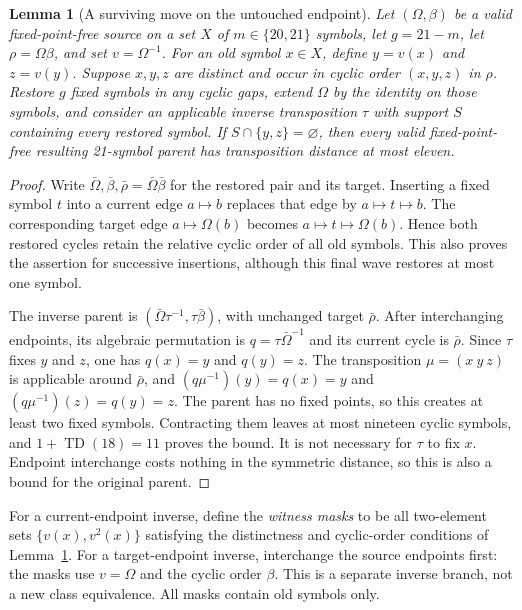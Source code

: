\documentclass[11pt,a4paper]{article}
\newcommand{\TD}{\operatorname{TD}}
\newtheorem{lemma}{Lemma}
\begin{document}
\begin{lemma}[A surviving move on the untouched endpoint]
\label{lem:inverse-family}
Let $(\Omega,\beta)$ be a valid fixed-point-free source on a set $X$ of
$m\in\{20,21\}$ symbols, let $g=21-m$, let $\rho=\Omega\beta$, and set
$v=\Omega^{-1}$. For an old symbol $x\in X$, define $y=v(x)$ and $z=v(y)$.
Suppose $x,y,z$ are distinct and occur in cyclic order $(x,y,z)$ in $\rho$.
Restore $g$ fixed symbols in any cyclic gaps, extend $\Omega$ by the identity
on those symbols, and consider an applicable inverse transposition $\tau$
with support $S$ containing every restored symbol. If
$S\cap\{y,z\}=\varnothing$, then every valid fixed-point-free resulting
21-symbol parent has transposition distance at most eleven.
\end{lemma}
\begin{proof}
Write $\bar\Omega,\bar\beta,\bar\rho=\bar\Omega\bar\beta$ for the restored
pair and its target. Inserting a fixed symbol $t$ into a current edge
$a\mapsto b$ replaces that edge by $a\mapsto t\mapsto b$. The corresponding
target edge $a\mapsto\Omega(b)$ becomes
$a\mapsto t\mapsto\Omega(b)$. Hence both restored cycles retain the
relative cyclic order of all old symbols. This also proves the assertion for
successive insertions, although this final wave restores at most one symbol.

The inverse parent is
$(\bar\Omega\tau^{-1},\tau\bar\beta)$, with unchanged target $\bar\rho$.
After interchanging endpoints, its algebraic permutation is
$q=\tau\bar\Omega^{-1}$ and its current cycle is $\bar\rho$. Since $\tau$
fixes $y$ and $z$, one has $q(x)=y$ and $q(y)=z$. The transposition
$\mu=(x\ y\ z)$ is applicable around $\bar\rho$, and
$(q\mu^{-1})(y)=q(x)=y$ and $(q\mu^{-1})(z)=q(y)=z$. The parent has no
fixed points, so this creates at least two fixed symbols. Contracting them
leaves at most nineteen cyclic symbols, and
$1+\TD(18)=11$ proves the bound. It is not necessary for $\tau$ to fix $x$.
Endpoint interchange costs nothing in the symmetric distance, so this is
also a bound for the original parent.
\end{proof}

For a current-endpoint inverse, define the \emph{witness masks} to be all
two-element sets $\{v(x),v^2(x)\}$ satisfying the distinctness and cyclic-order
conditions of Lemma~\ref{lem:inverse-family}. For a target-endpoint inverse,
interchange the source endpoints first: the masks use $v=\Omega$ and the
cyclic order $\beta$. This is a separate inverse branch, not a new class
equivalence. All masks contain old symbols only.
\end{document}
